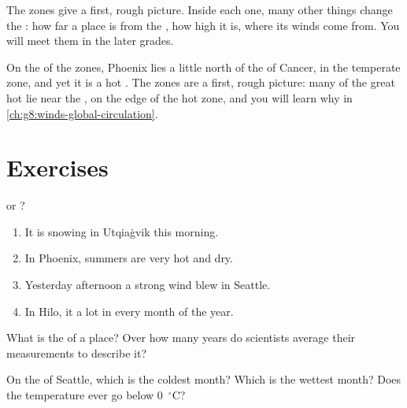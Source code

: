 The zones give a first, rough picture. Inside each one, many other things
change the : how far a place is from the , how high it is, where
its winds come from. You will meet them in the later grades.

\begin{remark}\label{rem:g5:weather-and-climate:phoenix}
On the  of the zones, Phoenix lies a little north of the  of
Cancer, in the temperate zone, and yet it is a hot . The zones are a
first, rough picture: many of the great hot  lie near the ,
on the edge of the hot zone, and you will learn why in
\cref{ch:g8:winds-global-circulation}.
\end{remark}

\section{Exercises}

\begin{exercise}[$\star$]\label{exo:g5:weather-and-climate:1}
 or ?
\begin{enumerate}
  \item[(a)] It is snowing in Utqiaġvik this morning.
  \item[(b)] In Phoenix, summers are very hot and dry.
  \item[(c)] Yesterday afternoon a strong wind blew in Seattle.
  \item[(d)] In Hilo, it  a lot in every month of the year.
\end{enumerate}
\end{exercise}

\begin{exercise}[$\star$]\label{exo:g5:weather-and-climate:2}
What is the  of a place? Over how many years do  scientists
average their measurements to describe it?
\end{exercise}

\begin{exercise}[$\star$]\label{exo:g5:weather-and-climate:3}
On the  of Seattle, which is the coldest month? Which is the
wettest month? Does the temperature ever go below 0~$^\circ$C?
\end{exercise}

